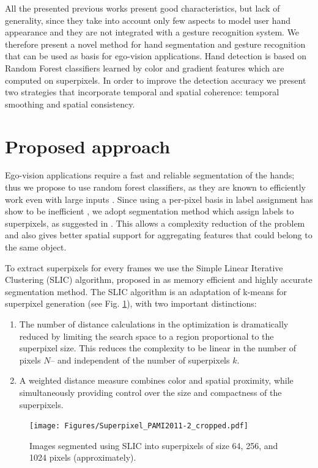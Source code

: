 All the presented previous works present good characteristics, but lack of generality, since they take into account only few aspects to model user hand appearance and they are not integrated with a gesture recognition system. We therefore present a novel method for hand segmentation and gesture recognition that can be used as basis for ego-vision applications. 
Hand detection is based on Random Forest classifiers learned by color and gradient features which are computed on superpixels. In order to improve the detection accuracy we present two strategies that incorporate temporal and spatial coherence: temporal smoothing and spatial consistency.

\section{Proposed approach}
Ego-vision applications require a fast and reliable segmentation of the hands; thus we propose to use random forest classifiers, as they are known to efficiently work even with large inputs \cite{leo01}. Since using a per-pixel basis in label assignment has show to be inefficient \cite{jones99}, we adopt segmentation method which assign labels to superpixels, as suggested in \cite{tighe13}. 
This allows a complexity reduction of the problem and also gives better spatial support for aggregating features that could belong to the same object. 

To extract superpixels for every frames we use the Simple Linear Iterative Clustering (SLIC) algorithm, proposed in \cite{achanta12} as memory efficient and highly accurate segmentation method.  The SLIC algorithm is an adaptation of k-means for superpixel generation (see Fig. \ref{fig:SLIC}), with two important distinctions:
\begin{enumerate}
\item The number of distance calculations in the optimization is dramatically reduced by limiting the search space to a
region proportional to the superpixel size. This reduces the complexity to be linear in the number of pixels $N$– and independent of the number of superpixels $k$.
\item A weighted distance measure combines color and spatial proximity, while simultaneously providing control over the size and compactness of the superpixels.
\end{enumerate}

\begin{figure}[htbp]
	\centering
		\texttt{[image: Figures/Superpixel\_PAMI2011-2\_cropped.pdf]}
	\caption{Images segmented using SLIC into superpixels of size 64, 256,
and 1024 pixels (approximately).}
	\label{fig:SLIC}
\end{figure}

